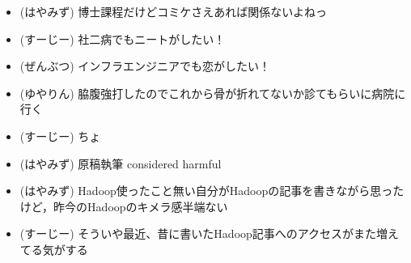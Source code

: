 
%
%

\begin{itemize}
 \item (はやみず) 博士課程だけどコミケさえあれば関係ないよねっ
 \item (すーじー) 社二病でもニートがしたい！
 \item (ぜんぶつ) インフラエンジニアでも恋がしたい！
 \item (ゆやりん) 脇腹強打したのでこれから骨が折れてないか診てもらいに病院に行く
 \item (すーじー) ちょ
 \item (はやみず) 原稿執筆 considered harmful
 \item (はやみず) Hadoop使ったこと無い自分がHadoopの記事を書きながら思ったけど，昨今のHadoopのキメラ感半端ない
 \item (すーじー) そういや最近、昔に書いたHadoop記事へのアクセスがまた増えてる気がする
\end{itemize}
